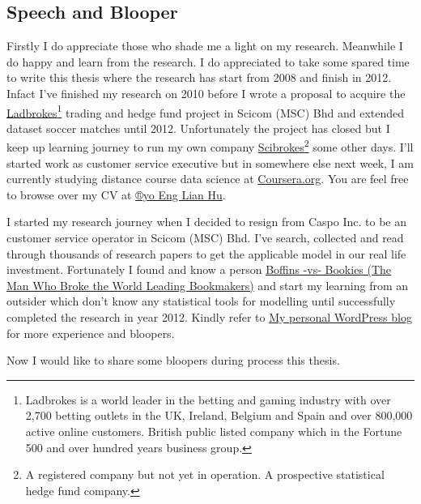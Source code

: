 \documentclass[article]{jss}
\begin{document}
\subsection{Speech and Blooper}\label{speech-and-blooper}

Firstly I do appreciate those who shade me a light on my research.
Meanwhile I do happy and learn from the research. I do appreciated to
take some spared time to write this thesis where the research has start
from 2008 and finish in 2012. Infact I've finished my research on 2010
before I wrote a proposal to acquire the
\href{http://www.ladbrokesplc.com/}{Ladbrokes}\footnote{Ladbrokes is a
  world leader in the betting and gaming industry with over 2,700
  betting outlets in the UK, Ireland, Belgium and Spain and over 800,000
  active online customers. British public listed company which in the
  Fortune 500 and over hundred years business group.} trading and hedge
fund project in Scicom (MSC) Bhd and extended dataset soccer matches
until 2012. Unfortunately the project has closed but I keep up learning
journey to run my own company
\href{https://github.com/scibrokes/owner}{Scibrokes}\footnote{A
  registered company but not yet in operation. A prospective statistical
  hedge fund company.} some other days. I'll started work as customer
service executive but in somewhere else next week, I am currently
studying distance course data science at
\href{http://www.coursera.org}{Coursera.org}. You are feel free to
browse over my CV at
\href{https://beta.rstudioconnect.com/englianhu/ryo-eng/}{®yo Eng Lian
Hu}. \bigbreak

I started my research journey when I decided to resign from Caspo Inc.
to be an customer service operator in Scicom (MSC) Bhd. I've search,
collected and read through thousands of research papers to get the
applicable model in our real life investment. Fortunately I found and
know a person
\href{https://englianhu.wordpress.com/sportsbook/boffins-vs-bookies-the-man-who-broke-the-world-leading-bookmakers/}{Boffins
-vs- Bookies (The Man Who Broke the World Leading Bookmakers)} and start
my learning from an outsider which don't know any statistical tools for
modelling until successfully completed the research in year 2012. Kindly
refer to \href{https://englianhu.wordpress.com/}{My personal WordPress
blog} for more experience and bloopers. \bigbreak

Now I would like to share some bloopers during process this thesis.
\end{document}
